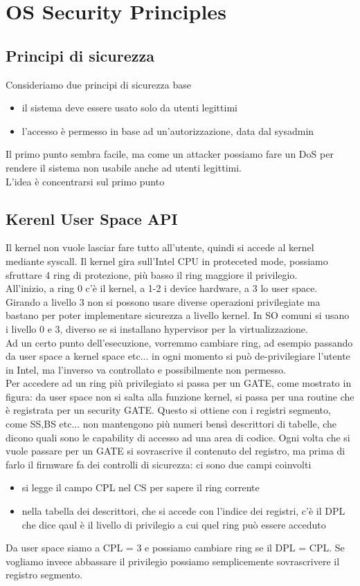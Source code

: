 \documentclass[12pt, oneside]{extbook} %
\begin{document}
\chapter{OS Security Principles}
\section{Principi di sicurezza}
Consideriamo due principi di sicurezza base
\begin{itemize}
\item il sistema deve essere usato solo da utenti legittimi
\item l'accesso è permesso in base ad un'autorizzazione, data dal sysadmin
\end{itemize}
Il primo punto sembra facile, ma come un attacker possiamo fare un DoS per rendere il sistema non usabile anche ad utenti legittimi.\\L'idea è concentrarsi sul primo punto
\section{Kerenl User Space API}
Il kernel non vuole lasciar fare tutto all'utente, quindi si accede al kernel mediante syscall. Il kernel gira sull'Intel CPU in proteceted mode, possiamo sfruttare 4 ring di protezione, più basso il ring maggiore il privilegio.\\All'inizio, a ring 0 c'è il kernel, a 1-2 i device hardware, a 3 lo user space. Girando a livello 3 non si possono usare diverse operazioni privilegiate ma bastano per poter implementare sicurezza a livello kernel. In SO comuni si usano i livello 0 e 3, diverso se si installano hypervisor per la virtualizzazione.\\Ad un certo punto dell'esecuzione, vorremmo cambiare ring, ad esempio passando da user space a kernel space etc... in ogni momento si può de-privilegiare l'utente in Intel, ma l'inverso va controllato e possibilmente non permesso.\\Per accedere ad un ring più privilegiato si passa per un GATE, come mostrato in figura:
da user space non si salta alla funzione kernel, si passa per una routine che è registrata per un security GATE. Questo si ottiene con i registri segmento, come SS,BS etc... non mantengono più numeri bensì descrittori di tabelle, che dicono quali sono le capability di accesso ad una area di codice. Ogni volta che si vuole passare per un GATE si sovrascrive il contenuto del registro, ma prima di farlo il firmware fa dei controlli di sicurezza: ci sono due campi coinvolti
\begin{itemize}
\item si legge il campo CPL nel CS per sapere il ring corrente
\item nella tabella dei descrittori, che si accede con l'indice dei registri, c'è il DPL che dice qaul è il livello di privilegio a cui quel ring può essere acceduto
\end{itemize}
Da user space siamo a CPL = 3 e possiamo cambiare ring se il DPL = CPL. Se vogliamo invece abbassare il privilegio possiamo semplicemente sovrascrivere il registro segmento.
\end{document}
